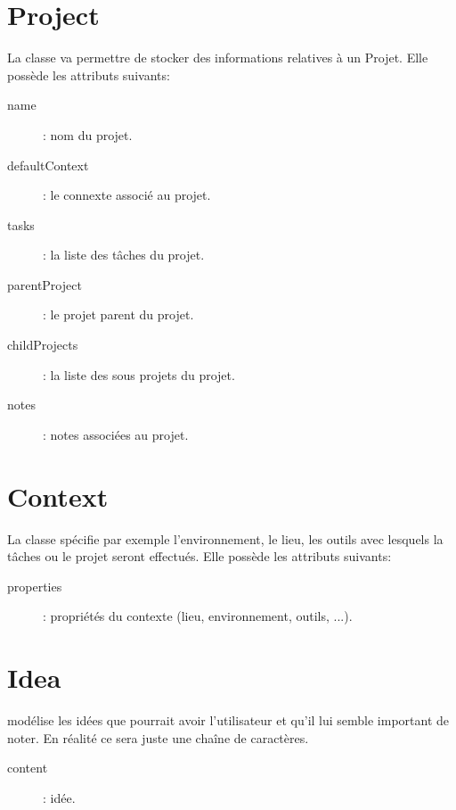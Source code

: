\section{Project}

La classe  va permettre de stocker des informations relatives à un Projet. Elle possède les attributs suivants:\\

\begin{description}
	\item[name]: nom du projet.
	\item[defaultContext]: le connexte associé au projet.
	\item[tasks]: la liste des tâches du projet.
	\item[parentProject]: le projet parent du projet.
	\item[childProjects]: la liste des sous projets du projet.
	\item[notes]: notes associées au projet.
\end{description}

\section{Context}

La classe  spécifie par exemple l'environnement, le lieu, les outils avec lesquels la tâches ou le projet seront effectués. Elle possède les attributs suivants:\\

\begin{description}
	\item[properties]: propriétés du contexte (lieu, environnement, outils, ...).
\end{description}

\section{Idea}

 modélise les idées que pourrait avoir l'utilisateur et qu'il lui semble important de noter. En réalité ce sera juste une chaîne de caractères.\\

\begin{description}
	\item[content]: idée.
\end{description}
